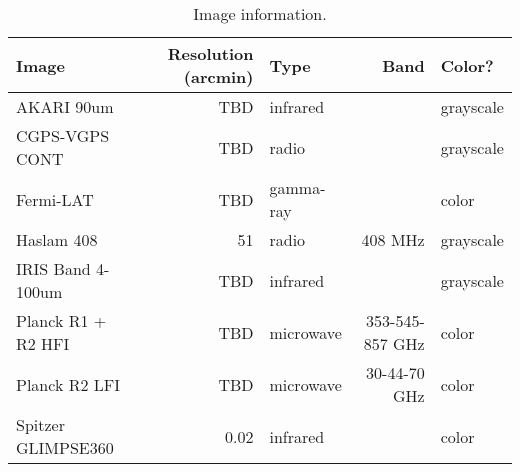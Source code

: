 
\begin{table}[tb]

\caption{Image information.}
\label{tab:images}
\begin{tabular}{ lrlrl }
\hline

Image & Resolution (arcmin) & Type & Band & Color?\\ \hline
AKARI 90um & TBD & infrared &  & grayscale\\
CGPS-VGPS CONT & TBD & radio &  & grayscale\\
Fermi-LAT & TBD & gamma-ray &  & color\\
Haslam 408 & 51 & radio & 408 MHz & grayscale\\
IRIS Band 4-100um & TBD & infrared &  & grayscale\\
Planck R1 + R2 HFI & TBD & microwave & 353-545-857 GHz & color\\
Planck R2 LFI & TBD & microwave & 30-44-70 GHz & color\\
Spitzer GLIMPSE360 & 0.02 & infrared &  & color\\
\hline
\end{tabular}

\end{table}
